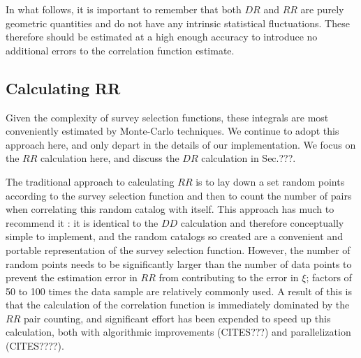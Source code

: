 \documentclass[usenatbib]{mn2e}
\begin{document}
In what follows, it is important to remember that both $DR$ and $RR$ are purely
geometric quantities and do not have any intrinsic statistical fluctuations.
These therefore should be estimated at a high enough accuracy to introduce no
additional errors to the correlation function estimate. 

\subsection{Calculating RR}

Given the complexity of survey selection functions, these integrals are most
conveniently estimated by Monte-Carlo techniques. We continue to adopt this
approach here, and only depart in the details of our implementation. We focus on
the $RR$ calculation here, and discuss the $DR$ calculation in Sec.???. 

The traditional approach to calculating $RR$ is to lay down a set random points
according to the survey selection function and then to count the number of pairs
when correlating this random catalog with itself. This approach has much to
recommend it : it is identical to the $DD$ calculation and therefore
conceptually simple to implement, and the random catalogs so created are a
convenient and portable representation of the survey selection function.
However, the number of random points needs to be significantly larger than the
number of data points to prevent the estimation error in $RR$ from contributing
to the error in $\xi$; factors of 50 to 100 times the data sample are relatively
commonly used. A result of this is that the calculation of the correlation
function is immediately dominated by the $RR$ pair counting, and significant
effort has been expended to speed up this calculation, both with algorithmic
improvements (CITES???) and parallelization (CITES????).
\end{document}
